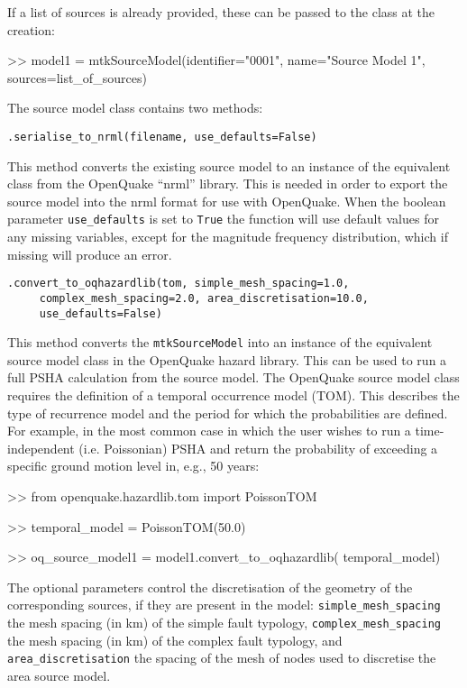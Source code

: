 If a list of sources is already provided, these can be passed to the class at the creation:

\begin{python}[frame=single]
>> model1 = mtkSourceModel(identifier="0001",
                           name="Source Model 1",
                           sources=list_of_sources)
\end{python}

The source model class contains two methods:

\verb;.serialise_to_nrml(filename, use_defaults=False);

This method converts the existing source model to an instance of the equivalent class from the OpenQuake ``nrml'' library. This is needed in order to export the source model into the nrml format for use with OpenQuake. When the boolean parameter \verb=use_defaults= is set to \verb=True= the function will use default values for any missing variables, except for the magnitude frequency distribution, which if missing will produce an error.

\verb;.convert_to_oqhazardlib(tom, simple_mesh_spacing=1.0,;\\
\verb;     complex_mesh_spacing=2.0, area_discretisation=10.0,;\\
\verb;     use_defaults=False);

This method converts the \verb=mtkSourceModel= into an instance of the equivalent source model class in the OpenQuake hazard library. This can be used to run a full PSHA calculation from the source model. The OpenQuake source model class requires the definition of a temporal occurrence model (TOM). This describes the type of recurrence model and the period for which the probabilities are defined. For example, in the most common case in which the user wishes to run a time-independent (i.e. Poissonian) PSHA and return the probability of exceeding a specific ground motion level in, e.g., 50 years:

\begin{python}[frame=single]
>> from openquake.hazardlib.tom import PoissonTOM

>> temporal_model = PoissonTOM(50.0)

>> oq_source_model1 = model1.convert_to_oqhazardlib(
    temporal_model)
\end{python}

The optional parameters control the discretisation of the geometry of the corresponding sources, if they are present in the model: \verb=simple_mesh_spacing= the mesh spacing (in km) of the simple fault typology, \verb=complex_mesh_spacing= the mesh spacing (in km) of the complex fault typology, and \verb=area_discretisation= the spacing of the mesh of nodes used to discretise the area source model.

